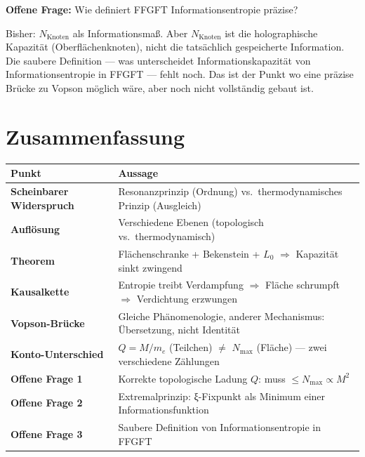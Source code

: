 \textbf{Offene Frage:} Wie definiert FFGFT Informationsentropie präzise?

Bisher: $N_\text{Knoten}$ als Informationsmaß. Aber $N_\text{Knoten}$ ist die holographische Kapazität (Oberflächenknoten), nicht die tatsächlich gespeicherte Information. Die saubere Definition --- was unterscheidet Informationskapazität von Informationsentropie in FFGFT --- fehlt noch. Das ist der Punkt wo eine präzise Brücke zu Vopson möglich wäre, aber noch nicht vollständig gebaut ist.

\section*{Zusammenfassung}

\begin{longtable}{>{\bfseries}p{6cm} p{8cm}}
\toprule
Punkt & Aussage \\
\midrule
Scheinbarer Widerspruch & Resonanzprinzip (Ordnung) vs.\ thermodynamisches Prinzip (Ausgleich) \\
Auflösung & Verschiedene Ebenen (topologisch vs.\ thermodynamisch) \\
Theorem & Flächenschranke + Bekenstein + $L_0$ $\Rightarrow$ Kapazität sinkt zwingend \\
Kausalkette & Entropie treibt Verdampfung $\Rightarrow$ Fläche schrumpft $\Rightarrow$ Verdichtung erzwungen \\
Vopson-Brücke & Gleiche Phänomenologie, anderer Mechanismus: Übersetzung, nicht Identität \\
Konto-Unterschied & $Q = M/m_e$ (Teilchen) $\neq$ $N_\text{max}$ (Fläche) --- zwei verschiedene Zählungen \\
Offene Frage 1 & Korrekte topologische Ladung $Q$: muss $\leq N_\text{max} \propto M^2$ \\
Offene Frage 2 & Extremalprinzip: ξ-Fixpunkt als Minimum einer Informationsfunktion \\
Offene Frage 3 & Saubere Definition von Informationsentropie in FFGFT \\
\bottomrule
\end{longtable}
